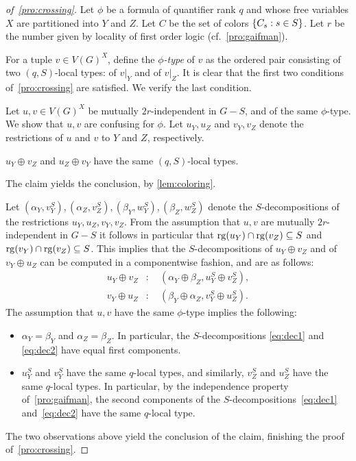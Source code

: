 \begin{proof}[of~\cref{pro:crossing}]
Let $\phi$ be a formula
	of  quantifier rank $q$
  and whose free variables $X$ are partitioned into $Y$ and $Z$.
  Let $C$ be the set of colors $\{C_s:s\in S\}$.
  Let $r$ be the number given by locality of first order logic (cf.~\cref{pro:gaifman}).
  

	For a tuple $v\in V(G)^X$, define the \emph{$\phi$-type} of $v$
  as the ordered pair consisting of two $(q,S)$-local types: of $v|_Y$  and of $v|_Z$. 
 It is clear that the first two conditions of~\cref{pro:crossing} are satisfied. We verify the last condition.
	
Let $u,v\in V(G)^X$ be mutually $2r$-independent in $G-S$,
and of the same $\phi$-type. We show that $u,v$
are confusing for $\phi$. 
Let $u_Y,u_Z$ and $v_Y,v_Z$ denote the restrictions of $u$ and $v$ to $Y$ and $Z$, respectively. 

\begin{claim}
 $u_Y\oplus v_Z$ and $u_Z\oplus v_Y$ have the same 
$(q,S)$-local types.  
\end{claim}
The claim yields the conclusion, by \cref{lem:coloring}.

\medskip
Let $(\alpha_Y,v_Y^S),(\alpha_Z,v_Z^S),(\beta_Y,w_Y^S),(\beta_Z,w_Z^S)$ denote the $S$-decompositions of the restrictions $u_Y,u_Z,v_Y,v_Z$. 
From the assumption that $u,v$ are mutually $2r$-independent in $G-S$ it follows in particular that
 $\mathrm{rg}(u_Y)\cap\mathrm{rg}(v_Z)\subseteq S$
and  $\mathrm{rg}(v_Y)\cap \mathrm{rg}(v_Z)\subseteq S$.
This implies that the $S$-decompositions of $u_Y\oplus v_Z$
and of  $v_Y\oplus u_Z$ can be computed in a componentwise fashion, and are as follows:
\begin{align}
u_Y\oplus v_Z &:\quad (\alpha_Y\oplus \beta_Z,  u_Y^S\oplus v_Z^S)\label{eq:dec1},\\  
v_Y\oplus u_Z &:\quad (\beta_Y\oplus \alpha_Z, v_Y^S\oplus u_Z^S)\label{eq:dec2}.
\end{align}
The assumption that $u,v$ have the same $\phi$-type implies the following:
\begin{itemize}
  \item  $\alpha_Y=\beta_Y$ and $\alpha_Z=\beta_Z$.
  In particular, the $S$-decompositions
  \eqref{eq:dec1} and \eqref{eq:dec2}  have equal first components.
  
    \item  $u_Y^S$ and  $v_Y^S$ have 
  the same $q$-local types, and similarly,
  $v_Z^S$ and  $u_Z^S$ have the same $q$-local types.
  In particular, by the independence property of~\cref{pro:gaifman}, the second components of the $S$-decompositions~\eqref{eq:dec1} and~\eqref{eq:dec2}
  have the same $q$-local type. 
\end{itemize}
The two observations above yield the conclusion of the claim, finishing the proof of~\cref{pro:crossing}.
\end{proof}



